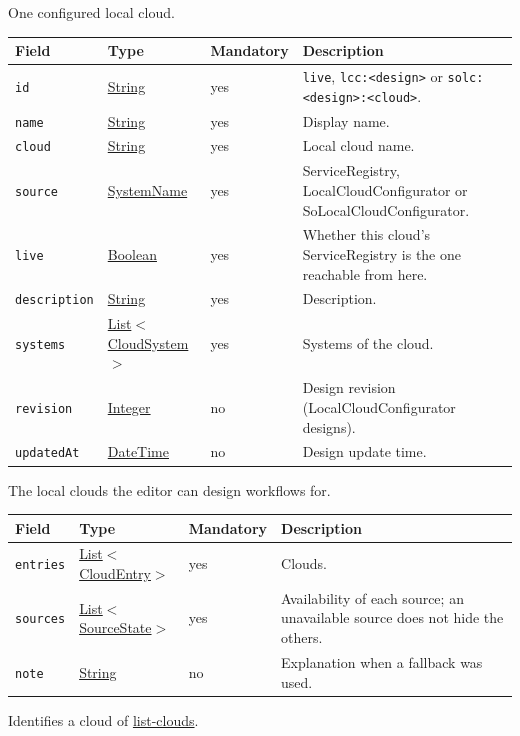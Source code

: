 \documentclass[a4paper]{arrowhead}
\newcommand{\mref}[1]{{\textcolor{ArrowheadPurple}{\hyperref[sec:model:#1]{#1}}}}
\newcommand{\oref}[1]{{\textcolor{ArrowheadBlue}{\hyperref[sec:operations:#1]{#1}}}}
\newcommand{\pref}[1]{{\textcolor{ArrowheadGrey}{\hyperref[sec:model:primitives:#1]{#1}}}}
\begin{document}
One configured local cloud.

{\small
\begin{longtable}{|p{3.7cm}|p{4.2cm}|p{1.6cm}|p{6.3cm}|}

\hline
\rowcolor{gray!33} Field & Type & Mandatory & Description \\ \hline
\endhead
\texttt{id} & \pref{String} & yes & \texttt{live}, \texttt{lcc:<design>} or \texttt{solc:<design>:<cloud>}. \\ \hline
\texttt{name} & \pref{String} & yes & Display name. \\ \hline
\texttt{cloud} & \pref{String} & yes & Local cloud name. \\ \hline
\texttt{source} & \pref{SystemName} & yes & ServiceRegistry, LocalCloudConfigurator or SoLocalCloudConfigurator. \\ \hline
\texttt{live} & \pref{Boolean} & yes & Whether this cloud's ServiceRegistry is the one reachable from here. \\ \hline
\texttt{description} & \pref{String} & yes & Description. \\ \hline
\texttt{systems} & \pref{List}$<$\mref{CloudSystem}$>$ & yes & Systems of the cloud. \\ \hline
\texttt{revision} & \pref{Integer} & no & Design revision (LocalCloudConfigurator designs). \\ \hline
\texttt{updatedAt} & \pref{DateTime} & no & Design update time. \\ \hline
\end{longtable}
}

The local clouds the editor can design workflows for.

{\small
\begin{longtable}{|p{3.7cm}|p{4.2cm}|p{1.6cm}|p{6.3cm}|}

\hline
\rowcolor{gray!33} Field & Type & Mandatory & Description \\ \hline
\endhead
\texttt{entries} & \pref{List}$<$\mref{CloudEntry}$>$ & yes & Clouds. \\ \hline
\texttt{sources} & \pref{List}$<$\mref{SourceState}$>$ & yes & Availability of each source; an unavailable source does not hide the others. \\ \hline
\texttt{note} & \pref{String} & no & Explanation when a fallback was used. \\ \hline
\end{longtable}
}

Identifies a cloud of \oref{list-clouds}.
\end{document}
